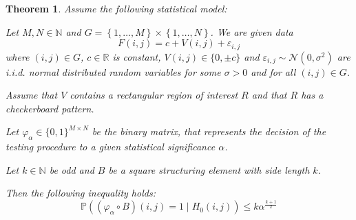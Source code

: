 \documentclass[a4paper,12pt]{article}
\theoremstyle{plain}
\newtheorem{theorem}{Theorem}[section]
\theoremstyle{definition}
\theoremstyle{remark}
\begin{document}
\newpage

\begin{theorem}
	Assume the following statistical model:
	
	Let $M, N \in \mathbb{N}$ and $G = \left\{ 1, \dots, M \right\} \times  \left\{ 1, \dots, N \right\}$. We are given data
	\begin{equation}\label{f}
		F(i, j) = c + V(i, j) + \varepsilon_{i, j}
	\end{equation}
	where $(i, j) \in G$, $c \in \mathbb{R}$ is constant, $V(i, j) \in \{ 0, \pm c \}$ and $\varepsilon_{i, j} \sim \mathcal{N}(0, \sigma^2)$ are i.i.d. normal distributed random variables for some $\sigma > 0$ and for all $(i, j) \in G$.
	
	Assume that $V$ contains a rectangular region of interest $R$ and that $R$ has a checkerboard pattern.
	
	Let $\varphi_\alpha \in \{ 0, 1 \}^{M \times N}$ be the binary matrix, that represents the decision of the testing procedure to a given statistical significance $\alpha$.
	
	Let $k \in \mathbb{N}$ be odd and $B$ be a square structuring element with side length $k$.
	
	Then the following inequality holds:
	\begin{equation*}
		\mathbb{P}((\varphi_\alpha \circ B)(i, j) = 1 \mid H_0(i, j)) \leq k \alpha^{\frac{k+1}{2}}
	\end{equation*}
\end{theorem}
\end{document}
